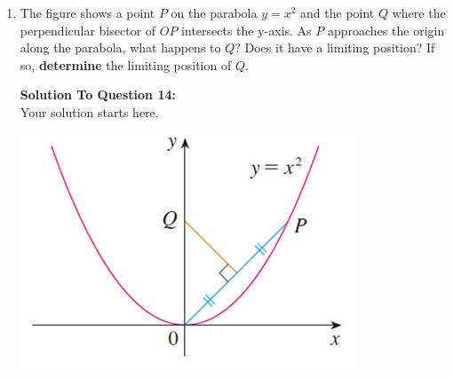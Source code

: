 \documentclass[12pt]{book}
\begin{document}
\begin{enumerate}
\newpage


\item The figure shows a point $P$ on the parabola $y=x^2$ and the point $Q$ where the perpendicular bisector of $OP$ intersects the y-axis. As $P$ approaches the origin along the parabola, what happens to $Q$? Does it have a limiting position? If so, \textbf{determine} the limiting position of $Q$. 

\vspace{0.3cm} 
\textbf{Solution To Question 14:}\\
 Your solution starts here.
\vspace{0.3cm}


\newpage
\vspace{4cm}
\includegraphics[width=\linewidth]{parabola.png}


\newpage



\end{enumerate}
\end{document}
